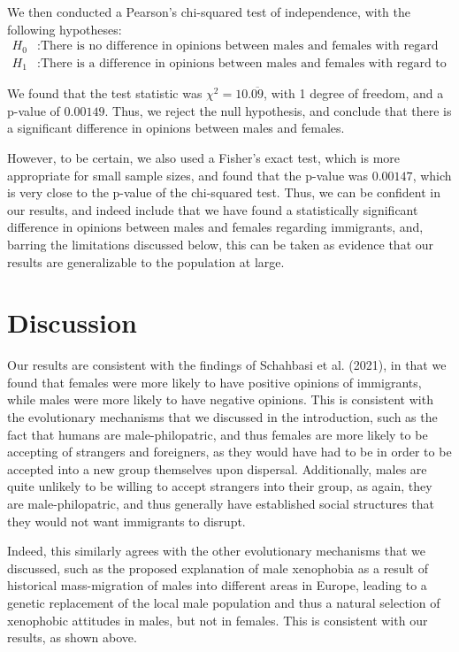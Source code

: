 \documentclass{article}
\begin{document}
We then conducted a Pearson's chi-squared test of independence, with the following hypotheses:
\begin{align*}
    H_0 &: \text{There is no difference in opinions between males and females with regard to immigrants.} \\
    H_1 &: \text{There is a difference in opinions between males and females with regard to immigrants.}
\end{align*}

We found that the test statistic was $\chi^2 = 10.\overline{09}$, with 1 degree of freedom, and a p-value of $0.00149$. Thus, we reject the null hypothesis, and conclude that there is a significant difference in opinions between males and females. 

However, to be certain, we also used a Fisher's exact test, which is more appropriate for small sample sizes, and found that the p-value was $0.00147$, which is very close to the p-value of the chi-squared test. Thus, we can be confident in our results, and indeed include that we have found a statistically significant difference in opinions between males and females regarding immigrants, and, barring the limitations discussed below, this can be taken as evidence that our results are generalizable to the population at large.

\section{Discussion}

Our results are consistent with the findings of Schahbasi et al. (2021), in that we found that females were more likely to have positive opinions of immigrants, while males were more likely to have negative opinions. This is consistent with the evolutionary mechanisms that we discussed in the introduction, such as the fact that humans are male-philopatric, and thus females are more likely to be accepting of strangers and foreigners, as they would have had to be in order to be accepted into a new group themselves upon dispersal. Additionally, males are quite unlikely to be willing to accept strangers into their group, as again, they are male-philopatric, and thus generally have established social structures that they would not want immigrants to disrupt.

Indeed, this similarly agrees with the other evolutionary mechanisms that we discussed, such as the proposed explanation of male xenophobia as a result of historical mass-migration of males into different areas in Europe, leading to a genetic replacement of the local male population and thus a natural selection of xenophobic attitudes in males, but not in females. This is consistent with our results, as shown above.
\end{document}
